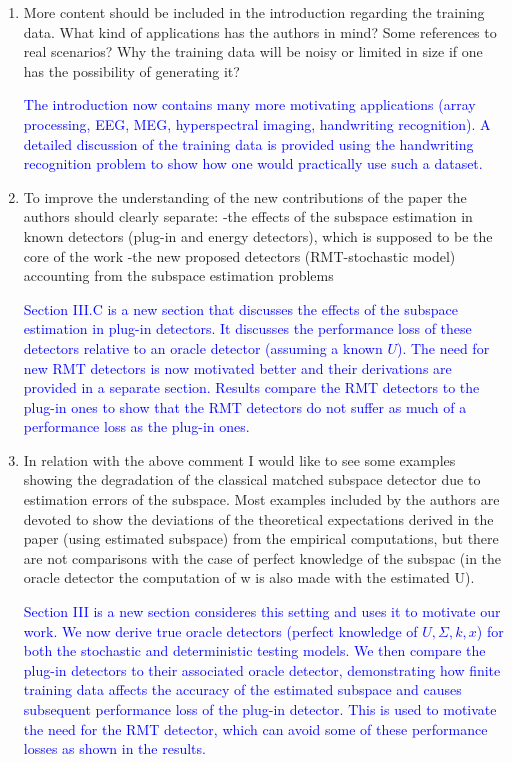\documentclass[11pt]{article}
\begin{document}
\begin{enumerate}
\item More content should be included in the introduction regarding the training data. What kind of applications has the authors in mind? Some references to real scenarios? Why the training data will be noisy or limited in size if one has the possibility of generating it?

\textcolor{blue}{The introduction now contains many more motivating applications (array processing, EEG, MEG, hyperspectral imaging, handwriting recognition). A detailed discussion of the training data is provided using the handwriting recognition problem to show how one would practically use such a dataset.}

\item To improve the understanding of the new contributions of the paper the authors should clearly separate:
  -the effects of the subspace estimation in known detectors (plug-in and energy detectors), which is supposed to be the core of the work
  -the new proposed detectors (RMT-stochastic model) accounting from the subspace estimation problems

\textcolor{blue}{Section III.C is a new section that discusses the effects of the subspace estimation in plug-in detectors. It discusses the performance loss of these detectors relative to an oracle detector (assuming a known $U$). The need for new RMT detectors is now motivated better and their derivations are provided in a separate section. Results compare the RMT detectors to the plug-in ones to show that the RMT detectors do not suffer as much of a performance loss as the plug-in ones. }

\item In relation with the above comment I would like to see some examples showing the degradation of the classical matched subspace detector due to estimation errors of the subspace. Most examples included by the authors are devoted to show the deviations of the theoretical expectations derived in the paper (using estimated subspace) from the empirical computations, but there are not comparisons with the case of perfect knowledge of the subspac (in the oracle detector the computation of w is also made with the estimated U).

\textcolor{blue}{Section III is a new section consideres this setting and uses it to motivate our work. We now derive true oracle detectors (perfect knowledge of $U,\Sigma,k,x$) for both the stochastic and deterministic testing models. We then compare the plug-in detectors to their associated oracle detector, demonstrating how finite training data affects the accuracy of the estimated subspace and causes subsequent performance loss of the plug-in detector. This is used to motivate the need for the RMT detector, which can avoid some of these performance losses as shown in the results.}


\end{enumerate}
\end{document}
